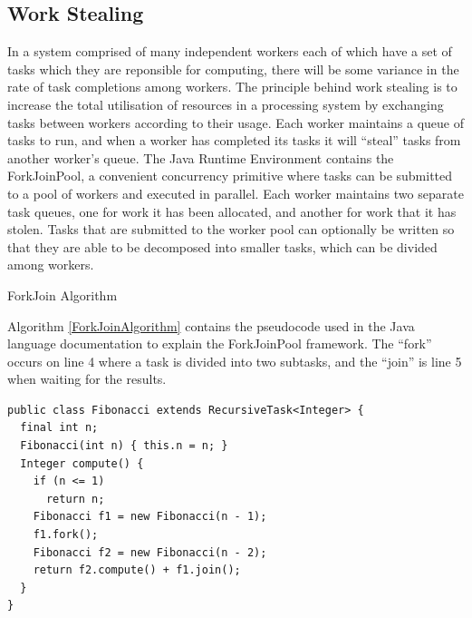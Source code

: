 \documentclass[12pt]{article}
\begin{document}
\subsection{Work Stealing}

In a system comprised of many independent workers each of which have a set of tasks which they are reponsible for computing, there will be some variance in the rate of task completions among workers.
\newline
\newline
The principle behind work stealing is to increase the total utilisation of resources in a processing system by exchanging tasks between workers according to their usage. Each worker maintains a queue of tasks to run, and when a worker has completed its tasks it will ``steal'' tasks from another worker's queue.
\newline
\newline
The Java Runtime Environment contains the ForkJoinPool\cite{javaThreads}, a convenient concurrency primitive where tasks can be submitted to a pool of workers and executed in parallel. Each worker maintains two separate task queues, one for work it has been allocated, and another for work that it has stolen. Tasks that are submitted to the worker pool can optionally be written so that they are able to be decomposed into smaller tasks, which can be divided among workers.
\newline

\IncMargin{1em}
\begin{algorithm}[H]
 \caption{ForkJoin Algorithm}
 \label{ForkJoinAlgorithm}
\end{algorithm}
\DecMargin{1em}
\medskip
Algorithm \ref{ForkJoinAlgorithm} contains the pseudocode used in the Java language documentation to explain the ForkJoinPool framework. The ``fork'' occurs on line 4 where a task is divided into two subtasks, and the ``join'' is line 5 when waiting for the results.

\newpage

\begin{lstlisting}[caption={An implementation of the Fibonacci algorithm using the ForkJoinFramework taken from the Java documentation},label=JavaRecursive]
public class Fibonacci extends RecursiveTask<Integer> {
  final int n;
  Fibonacci(int n) { this.n = n; }
  Integer compute() {
    if (n <= 1)
      return n;
    Fibonacci f1 = new Fibonacci(n - 1);
    f1.fork();
    Fibonacci f2 = new Fibonacci(n - 2);
    return f2.compute() + f1.join();
  }
}
\end{lstlisting}
\end{document}
